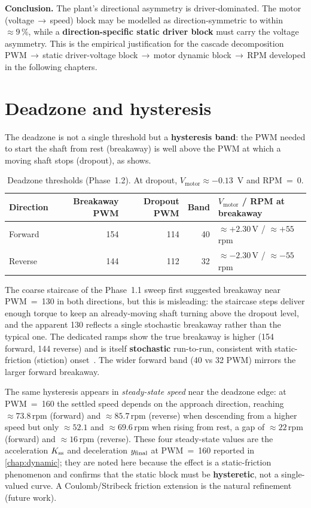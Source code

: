 \textbf{Conclusion.} The plant's directional asymmetry is driver-dominated. The motor (voltage\,$\to$\,speed) block may be modelled as direction-symmetric to within ${\approx}9\,\%$, while a \textbf{direction-specific static driver block} must carry the voltage asymmetry. This is the empirical justification for the cascade decomposition PWM\,$\to$\,static driver-voltage block\,$\to$\,motor dynamic block\,$\to$\,RPM developed in the following chapters.

\section{Deadzone and hysteresis}
\label{sec:deadzone}

The deadzone is not a single threshold but a \textbf{hysteresis band}: the PWM needed to start the shaft from rest (breakaway) is well above the PWM at which a moving shaft stops (dropout), as  shows.

\begin{table}[t]
  \centering
  \caption{Deadzone thresholds (Phase~1.2). At dropout, $V_{\mathrm{motor}} \approx -0.13$~V and RPM~=~0.}
  \label{tab:deadzone}
  \small
  \begin{tabular}{@{}lrrrl@{}}
    \toprule
    Direction & Breakaway PWM & Dropout PWM & Band & $V_{\mathrm{motor}}$ / RPM at breakaway \\
    \midrule
    Forward & 154 & 114 & 40 & ${\approx}{+}2.30$\,V / ${\approx}{+}55$\,rpm \\
    Reverse & 144 & 112 & 32 & ${\approx}{-}2.30$\,V / ${\approx}{-}55$\,rpm \\
    \bottomrule
  \end{tabular}
\end{table}

The coarse staircase of the Phase~1.1 sweep first suggested breakaway near PWM~=~130 in both directions, but this is misleading: the staircase steps deliver enough torque to keep an already-moving shaft turning above the dropout level, and the apparent 130 reflects a single stochastic breakaway rather than the typical one. The dedicated ramps show the true breakaway is higher (154 forward, 144 reverse) and is itself \textbf{stochastic} run-to-run, consistent with static-friction (stiction) onset~\citep{armstrong1994}. The wider forward band (40 vs 32 PWM) mirrors the larger forward breakaway.

The same hysteresis appears in \emph{steady-state speed} near the deadzone edge: at PWM~=~160 the settled speed depends on the approach direction, reaching ${\approx}73.8$\,rpm (forward) and ${\approx}85.7$\,rpm (reverse) when descending from a higher speed but only ${\approx}52.1$ and ${\approx}69.6$\,rpm when rising from rest, a gap of ${\approx}22$\,rpm (forward) and ${\approx}16$\,rpm (reverse). These four steady-state values are the acceleration $K_{\mathrm{ss}}$ and deceleration $y_{\mathrm{final}}$ at PWM~=~160 reported in \cref{chap:dynamic}; they are noted here because the effect is a static-friction phenomenon and confirms that the static block must be \textbf{hysteretic}, not a single-valued curve. A Coulomb/Stribeck friction extension is the natural refinement (future work).

